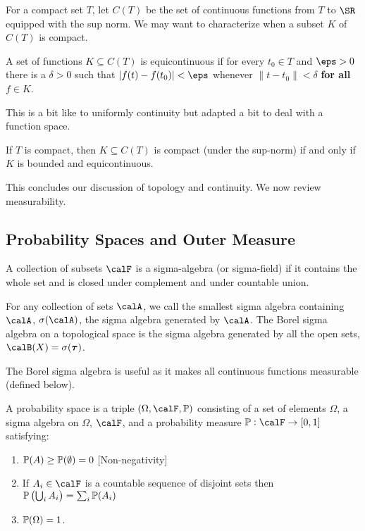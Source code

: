 For a compact set \(T\), let  \(C(T)\) be the set of continuous functions from  \(T\) to  \(\SR\) equipped with the sup norm. We may want to characterize when a subset \(K\) of  \(C(T)\) is compact. 

\begin{definition}[Equicontinuous]
	\label{def:equicontinuous}
	A set of functions \(K \subseteq C(T)\) is equicontinuous if for every  \(t_0 \in T\) and  \(\eps > 0\) there is a  \(\delta > 0\) such that  \(|f(t)-f(t_0)|<\eps\) whenever  \(\|t-t_0\|<\delta\) \textbf{for all} \(f\in K\).
\end{definition}
This is a bit like to uniformly continuity but adapted a bit to deal with a function space. 
\begin{theorem}
	\label{thm:aa}
	If  \(T\) is compact, then  \(K \subseteq C(T)\) is compact (under the sup-norm) if and only if  \(K\) is bounded and equicontinuous.
\end{theorem}

This concludes our discussion of topology and continuity. We now review measurability.

\subsection{Probability Spaces and Outer Measure}%
\label{sec:probability}
\begin{definition}
	\label{def:sigma-algebra}
	A collection of subsets \(\calF\) is a sigma-algebra (or sigma-field) if it contains the whole set and is closed under complement and under countable union.
\end{definition}

\begin{definition}
	\label{def:borel}
	For any collection of sets \(\calA\), we call the smallest sigma algebra containing \(\calA\), \(\sigma(\calA)\), the sigma algebra generated by \(\calA\). The Borel sigma algebra  on a topological space is the sigma algebra generated by all the open sets, \(\calB(X) = \sigma(\boldsymbol{\tau})\).
\end{definition}

The Borel sigma algebra is useful as it makes all continuous functions measurable (defined below). 

\begin{definition}
	\label{def:prob-space}
	A probability space is a triple \((\Omega, \calF, \P)\) consisting of a set of elements \(\Omega\), a sigma algebra on  \(\Omega\),  \(\calF\), and a probability measure  \(\P:\calF \to [0,1]\) satisfying:
	 \begin{enumerate}
		 \item \(\P(A) \geq \P(\emptyset) = 0\) [Non-negativity]
		 \item If \(A_i \in \calF\) is a countable sequence of disjoint sets then  \(\P\left(\bigcup_i A_i\right) = \sum_{i} \P(A_i)\) 
		 \item \(\P(\Omega) = 1\).
	\end{enumerate}
\end{definition}

